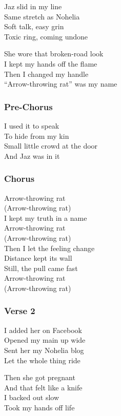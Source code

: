 Jaz slid in my line\\
Same stretch as Nohelia\\
Soft talk, easy grin\\
Toxic ring, coming undone

She wore that broken-road look\\
I kept my hands off the flame\\
Then I changed my handle\\
``Arrow-throwing rat'' was my name

\subsubsection{Pre-Chorus}\label{pre-chorus-29}

I used it to speak\\
To hide from my kin\\
Small little crowd at the door\\
And Jaz was in it

\subsubsection{Chorus}\label{chorus-48}

Arrow-throwing rat\\
(Arrow-throwing rat)\\
I kept my truth in a name\\
Arrow-throwing rat\\
(Arrow-throwing rat)\\
Then I let the feeling change\\
Distance kept its wall\\
Still, the pull came fast\\
Arrow-throwing rat\\
(Arrow-throwing rat)

\subsubsection{Verse 2}\label{verse-2-19}

I added her on Facebook\\
Opened my main up wide\\
Sent her my Nohelia blog\\
Let the whole thing ride

Then she got pregnant\\
And that felt like a knife\\
I backed out slow\\
Took my hands off life

